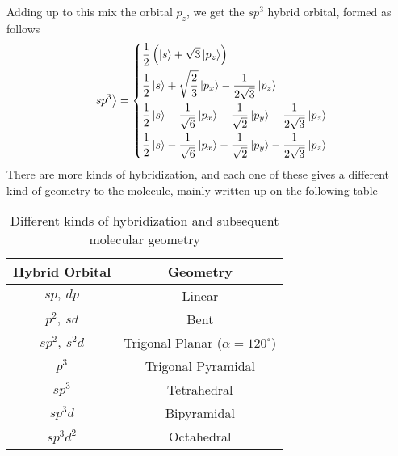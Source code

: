 \documentclass[../qm.tex]{subfiles}
\begin{document}
	Adding up to this mix the orbital $p_z$, we get the $sp^3$ hybrid orbital, formed as follows
	\begin{equation}
		\ket{sp^3}=\left\{\begin{aligned}
				&\frac{1}{2}\left( \ket{s}+\sqrt{3}\ket{p_z} \right)\\
				&\frac{1}{2}\ket{s}+\sqrt{\frac{2}{3}}\ket{p_x}-\frac{1}{2\sqrt{3}}\ket{p_z}\\
				&\frac{1}{2}\ket{s}-\frac{1}{\sqrt{6}}\ket{p_x}+\frac{1}{\sqrt{2}}\ket{p_y}-\frac{1}{2\sqrt{3}}\ket{p_z}\\
				&\frac{1}{2}\ket{s}-\frac{1}{\sqrt{6}}\ket{p_x}-\frac{1}{\sqrt{2}}\ket{p_y}-\frac{1}{2\sqrt{3}}\ket{p_z}
		\end{aligned}\right.
		\label{eq:sp3hybridization}
	\end{equation}
	There are more kinds of hybridization, and each one of these gives a different kind of geometry to the molecule, mainly written up on the following table
	\begin{table}[H]
		\centering
		\begin{tabular}{|c|c|}
			\hline
			Hybrid Orbital & Geometry\\
			\hline
			$sp,\ dp$& Linear\\
			$p^2,\ sd$& Bent\\
			$sp^2,\ s^2d$& Trigonal Planar ($\alpha=120^{\circ}$)\\
			$p^3$& Trigonal Pyramidal\\
			$sp^3$& Tetrahedral\\
			$sp^3d$& Bipyramidal\\
			$sp^3d^2$& Octahedral\\
			\hline
		\end{tabular}
		\caption{Different kinds of hybridization and subsequent molecular geometry}
		\label{tab:hybridorbitalstable}
	\end{table}
\end{document}
